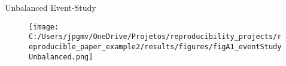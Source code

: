\documentclass[
  ignorenonframetext,
  aspectratio=169]{beamer}
\newcommand{\backupend}{
   \setcounter{framenumber}{\value{finalframe}}
}
\begin{document}
\begin{frame}{Unbalanced Event-Study
\hyperlink{balanced}{}}
\protect\hypertarget{unbalanced-event-study}{}
\label{unbalanced}

\begin{figure}
   \texttt{[image: C:/Users/jpgmv/OneDrive/Projetos/reproducibility\_projects/reproducible\_paper\_example2/results/figures/figA1\_eventStudyUnbalanced.png]}
\end{figure}

\backupend
\end{frame}
\end{document}
